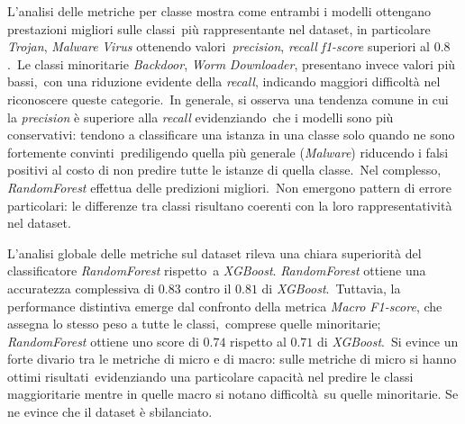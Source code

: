 \begin{figure}[]
    \centering
    \caption{}
    \label{fig:apimds-clx-met}
\end{figure}

L'analisi delle metriche per classe mostra come entrambi i modelli ottengano prestazioni migliori sulle classi\
più rappresentante nel dataset, in particolare \textit{Trojan}, \textit{Malware} \textit{Virus} ottenendo valori\
\textit{precision}, \textit{recall} \textit{f1-score} superiori al $0.8$.\
Le classi minoritarie \textit{Backdoor}, \textit{Worm} \textit{Downloader}, presentano invece valori più bassi,\
con una riduzione evidente della \textit{recall}, indicando maggiori difficoltà nel riconoscere queste categorie.\
In generale, si osserva una tendenza comune in cui la \textit{precision} è superiore alla \textit{recall} evidenziando\
che i modelli sono più conservativi: tendono a classificare una istanza in una classe solo quando ne sono fortemente convinti\
prediligendo quella più generale (\textit{Malware}) riducendo i falsi positivi al costo di non predire tutte le istanze di quella classe.\
Nel complesso, \textit{RandomForest} effettua delle predizioni migliori.\
Non emergono pattern di errore particolari: le differenze tra classi risultano coerenti con la loro rappresentatività nel dataset.

\begin{figure}[]
    \centering
    \adjustbox{max width=1.4\linewidth, max height=0.8\textheight}{%
        
    }
    \caption{\grpdescription{apimds}}
    \label{fig:apimds-clx-global}
\end{figure}

L'analisi globale delle metriche sul dataset rileva una chiara superiorità del classificatore \textit{RandomForest} rispetto\
a \textit{XGBoost}.
\textit{RandomForest} ottiene una accuratezza complessiva di $0.83$ contro il $0.81$ di \textit{XGBoost}.\
Tuttavia, la performance distintiva emerge dal confronto della metrica \textit{Macro F1-score}, che assegna lo stesso peso a tutte le classi,\
comprese quelle minoritarie; \textit{RandomForest} ottiene uno score di $0.74$ rispetto al $0.71$ di \textit{XGBoost}.\
Si evince un forte divario tra le metriche di micro e di macro: sulle metriche di micro si hanno ottimi risultati\
evidenziando una particolare capacità nel predire le classi maggioritarie mentre in quelle macro si notano difficoltà\
su quelle minoritarie. Se ne evince che il dataset è sbilanciato.

